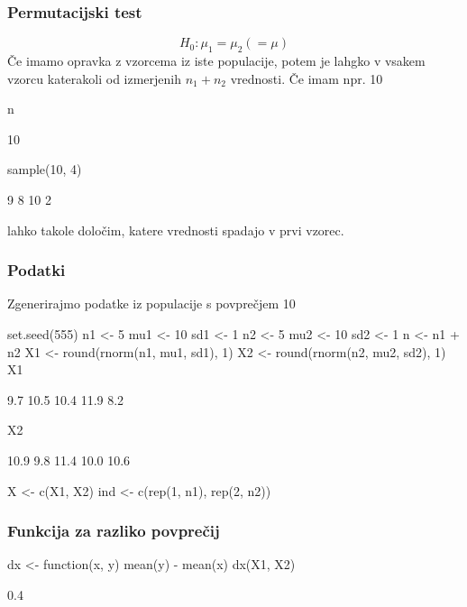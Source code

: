 \begin{frame}[fragile]
\frametitle{Permutacijski test}
$$H_0: \mu_1=\mu_2(=\mu)$$
Če imamo opravka z vzorcema iz iste populacije, potem je lahgko v vsakem vzorcu katerakoli od izmerjenih $n_1+n_2$ vrednosti. Če imam npr. 10
\begin{Schunk}
\begin{Sinput}
 n
\end{Sinput}
\begin{Soutput}
[1] 10
\end{Soutput}
\begin{Sinput}
 sample(10, 4)
\end{Sinput}
\begin{Soutput}
[1]  9  8 10  2
\end{Soutput}
\end{Schunk}
lahko takole določim, katere vrednosti spadajo v prvi vzorec.
\end{frame}

\begin{frame}[fragile]
\frametitle{Podatki}
Zgenerirajmo podatke iz populacije s povprečjem 10
\begin{Schunk}
\begin{Sinput}
 set.seed(555)
 n1 <- 5
 mu1 <- 10
 sd1 <- 1
 n2 <- 5
 mu2 <- 10
 sd2 <- 1
 n <- n1 + n2
 X1 <- round(rnorm(n1, mu1, sd1), 1)
 X2 <- round(rnorm(n2, mu2, sd2), 1)
 X1
\end{Sinput}
\begin{Soutput}
[1]  9.7 10.5 10.4 11.9  8.2
\end{Soutput}
\begin{Sinput}
 X2
\end{Sinput}
\begin{Soutput}
[1] 10.9  9.8 11.4 10.0 10.6
\end{Soutput}
\begin{Sinput}
 X <- c(X1, X2)
 ind <- c(rep(1, n1), rep(2, n2))
\end{Sinput}
\end{Schunk}
\end{frame}

\begin{frame}[fragile]
\frametitle{Funkcija za razliko povprečij}

\begin{Schunk}
\begin{Sinput}
 dx <- function(x, y) mean(y) - mean(x)
 dx(X1, X2)
\end{Sinput}
\begin{Soutput}
[1] 0.4
\end{Soutput}
\end{Schunk}
\end{frame}

